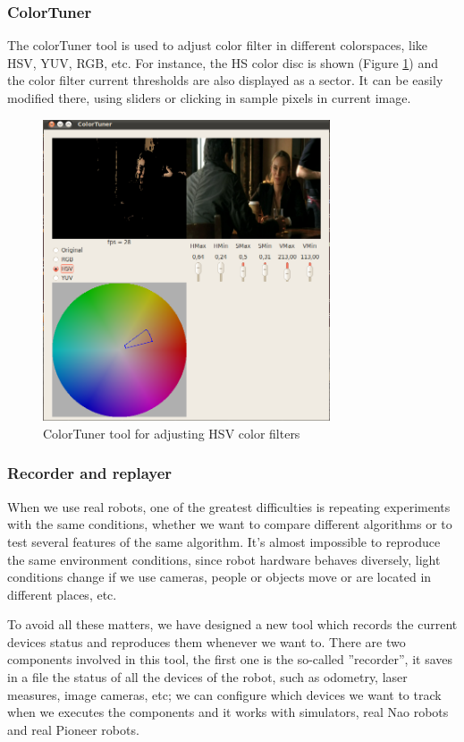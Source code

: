 \documentclass[twocolumn]{svjour3}          %
\begin{document}
\subsubsection{ColorTuner}

The colorTuner tool is used to adjust color filter in different colorspaces, like HSV, YUV, RGB, etc. For instance, the HS color disc is shown (Figure \ref{fig:colortuner}) and the color filter current thresholds are also displayed as a sector. It can be easily modified there, using sliders or clicking in sample pixels in current image.

\begin{figure}[h!]
  \includegraphics[width=8.5cm]{figs/colorTunerHSV.png}
\caption{ColorTuner tool for adjusting HSV color filters}
\label{fig:colortuner}
\end{figure}


\subsubsection{Recorder and replayer}

When we use real robots, one of the greatest difficulties is repeating experiments with the same conditions, whether we want to compare different algorithms or to test several features of the same algorithm. It's almost impossible to reproduce the same environment conditions, since robot hardware behaves diversely, light conditions change if we use cameras, people or objects move or are located in different places, etc.

To avoid all these matters, we have designed a new tool which records the current devices status and reproduces them whenever we want to. There are two components involved in this tool, the first one is the so-called ''recorder'', it saves in a file the status of all the devices of the robot, such as odometry, laser measures, image cameras, etc; we can configure which devices we want to track when we executes the components and it works with simulators, real Nao robots and real Pioneer robots.
\end{document}
